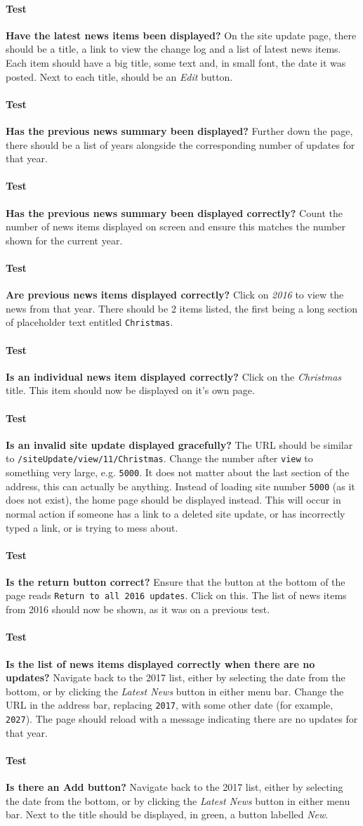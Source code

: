 \documentclass[12pt]{article}
\newcounter{Test}
\newcommand{\test}[1]{%
\stepcounter{Test}%
\paragraph{Test \theTest} \textbf{#1} }
\begin{document}
\test{Have the latest news items been displayed?}
On the site update page, there should be a title, a link to view the change log and a list of latest news items. Each item should have a big title, some text and, in small font, the date it was posted. Next to each title, should be an \textit{Edit} button.

\test{Has the previous news summary been displayed?}
Further down the page, there should be a list of years alongside the corresponding number of updates for that year.

\test{Has the previous news summary been displayed correctly?}
Count the number of news items displayed on screen and ensure this matches the number shown for the current year.

\test{Are previous news items displayed correctly?}
Click on \textit{2016} to view the news from that year. There should be 2 items listed, the first being a long section of placeholder text entitled \texttt{Christmas}.

\test{Is an individual news item displayed correctly?}
Click on the \textit{Christmas} title. This item should now be displayed on it's own page.

\test{Is an invalid site update displayed gracefully?}
The URL should be similar to \texttt{/siteUpdate/view/11/Christmas}. Change the number after \texttt{view} to something very large, e.g. \texttt{5000}. It does not matter about the last section of the address, this can actually be anything. Instead of loading site number \texttt{5000} (as it does not exist), the home page should be displayed instead. This will occur in normal action if someone has a link to a deleted site update, or has incorrectly typed a link, or is trying to mess about.

\test{Is the return button correct?}
Ensure that the button at the bottom of the page reads \texttt{Return to all 2016 updates}. Click on this. The list of news items from 2016 should now be shown, as it was on a previous test.

\test{Is the list of news items displayed correctly when there are no updates?}
Navigate back to the 2017 list, either by selecting the date from the bottom, or by clicking the \textit{Latest News} button in either menu bar. Change the URL in the address bar, replacing \texttt{2017}, with some other date (for example, \texttt{2027}). The page should reload with a message indicating there are no updates for that year.

\test{Is there an Add button?}
Navigate back to the 2017 list, either by selecting the date from the bottom, or by clicking the \textit{Latest News} button in either menu bar. Next to the title should be displayed, in green, a button labelled \textit{New}.
\end{document}
